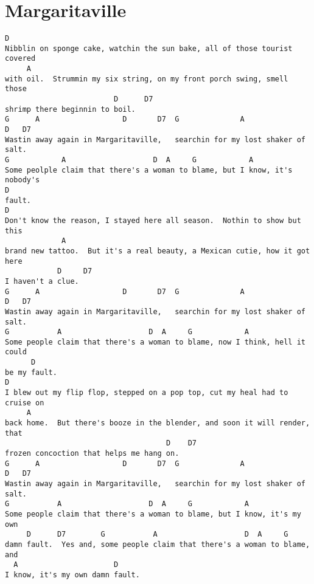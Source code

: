 \documentclass[leqno]{memoir}
\begin{document}
\chapter {Margaritaville}
\begin{verbatim}
D
Nibblin on sponge cake, watchin the sun bake, all of those tourist covered 
     A
with oil.  Strummin my six string, on my front porch swing, smell those 
                         D      D7
shrimp there beginnin to boil.
G      A                   D       D7  G              A               D   D7
Wastin away again in Margaritaville,   searchin for my lost shaker of salt.
G            A                    D  A     G            A
Some peolple claim that there's a woman to blame, but I know, it's nobody's
D
fault.
D
Don't know the reason, I stayed here all season.  Nothin to show but this 
             A
brand new tattoo.  But it's a real beauty, a Mexican cutie, how it got here 
            D     D7
I haven't a clue.
G      A                   D       D7  G              A               D   D7
Wastin away again in Margaritaville,   searchin for my lost shaker of salt.
G           A                    D  A     G            A
Some people claim that there's a woman to blame, now I think, hell it could
      D
be my fault.
D
I blew out my flip flop, stepped on a pop top, cut my heal had to cruise on 
     A
back home.  But there's booze in the blender, and soon it will render, that
                                     D    D7
frozen concoction that helps me hang on.
G      A                   D       D7  G              A               D   D7
Wastin away again in Margaritaville,   searchin for my lost shaker of salt.
G           A                    D  A     G            A
Some people claim that there's a woman to blame, but I know, it's my own 
     D      D7        G           A                    D  A     G
damn fault.  Yes and, some people claim that there's a woman to blame, and 
  A                      D
I know, it's my own damn fault.

\end{verbatim}
\newpage
\end{document}
